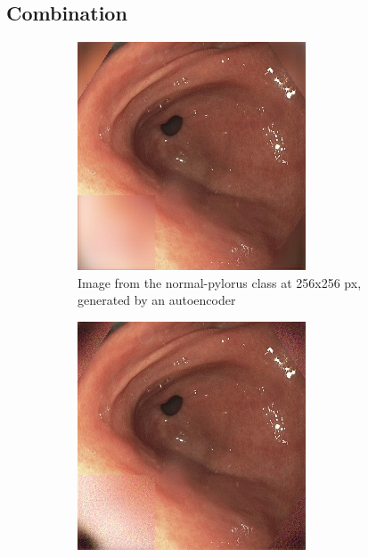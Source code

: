     \subsection{Combination}
        \begin{figure}
        \centering
        \begin{subfigure}[t]{0.4\textwidth}
            \centering
            \includegraphics[width=\textwidth]{experiments/figures/both/NPAE.jpg}
            \caption{Image from the normal-pylorus class at 256x256 px, generated by an autoencoder }    
            \label{fig:polypAEGREEN}
        \end{subfigure}
        \qquad
        \begin{subfigure}[t]{0.4\textwidth}  
            \centering 
            \includegraphics[width=\textwidth]{experiments/figures/both/NPGAN.jpg}

\end{subfigure}
\end{figure}
